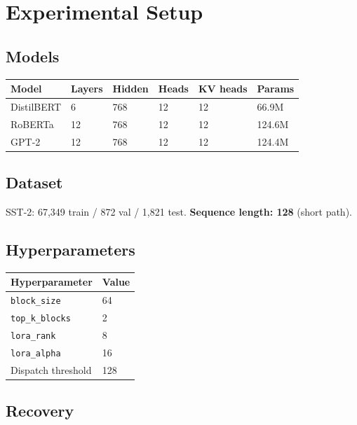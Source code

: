 \section{Experimental Setup}

\subsection{Models}

\begin{table}[H]
\centering
\small
\begin{tabular}{llllll}
\toprule
\textbf{Model} & \textbf{Layers} & \textbf{Hidden} & \textbf{Heads} & \textbf{KV heads} & \textbf{Params} \\
\midrule
DistilBERT & 6 & 768 & 12 & 12 & 66.9M \\
RoBERTa & 12 & 768 & 12 & 12 & 124.6M \\
GPT-2 & 12 & 768 & 12 & 12 & 124.4M \\
\bottomrule
\end{tabular}
\end{table}

\subsection{Dataset}

SST-2: 67,349 train / 872 val / 1,821 test. \textbf{Sequence length: 128} 
(short path).

\subsection{Hyperparameters}

\begin{table}[H]
\centering
\small
\begin{tabular}{ll}
\toprule
\textbf{Hyperparameter} & \textbf{Value} \\
\midrule
\texttt{block\_size} & 64 \\
\texttt{top\_k\_blocks} & 2 \\
\texttt{lora\_rank} & 8 \\
\texttt{lora\_alpha} & 16 \\
Dispatch threshold & 128 \\
\bottomrule
\end{tabular}
\end{table}

\subsection{Recovery}

